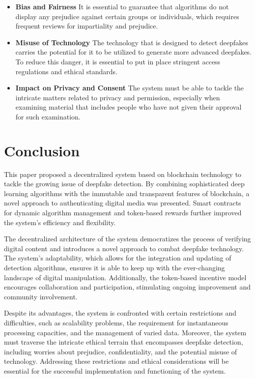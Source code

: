 \documentclass{article}
\begin{document}
\begin{itemize}
    \item \textbf{Bias and Fairness} It is essential to guarantee that algorithms do not display any prejudice against certain groups or individuals, which requires frequent reviews for impartiality and prejudice.
    \item \textbf{Misuse of Technology} The technology that is designed to detect deepfakes carries the potential for it to be utilized to generate more advanced deepfakes. To reduce this danger, it is essential to put in place stringent access regulations and ethical standards.
    \item \textbf{Impact on Privacy and Consent} The system must be able to tackle the intricate matters related to privacy and permission, especially when examining material that includes people who have not given their approval for such examination.

\end{itemize}

\section{Conclusion}

This paper proposed a decentralized system based on blockchain technology to tackle the growing issue of deepfake detection. By combining sophisticated deep learning algorithms with the immutable and transparent features of blockchain, a novel approach to authenticating digital media was presented. Smart contracts for dynamic algorithm management and token-based rewards further improved the system's efficiency and flexibility.

The decentralized architecture of the system democratizes the process of verifying digital content and introduces a novel approach to combat deepfake technology. The system's adaptability, which allows for the integration and updating of detection algorithms, ensures it is able to keep up with the ever-changing landscape of digital manipulation. Additionally, the token-based incentive model encourages collaboration and participation, stimulating ongoing improvement and community involvement.

Despite its advantages, the system is confronted with certain restrictions and difficulties, such as scalability problems, the requirement for instantaneous processing capacities, and the management of varied data. Moreover, the system must traverse the intricate ethical terrain that encompasses deepfake detection, including worries about prejudice, confidentiality, and the potential misuse of technology. Addressing these restrictions and ethical considerations will be essential for the successful implementation and functioning of the system.
\end{document}
